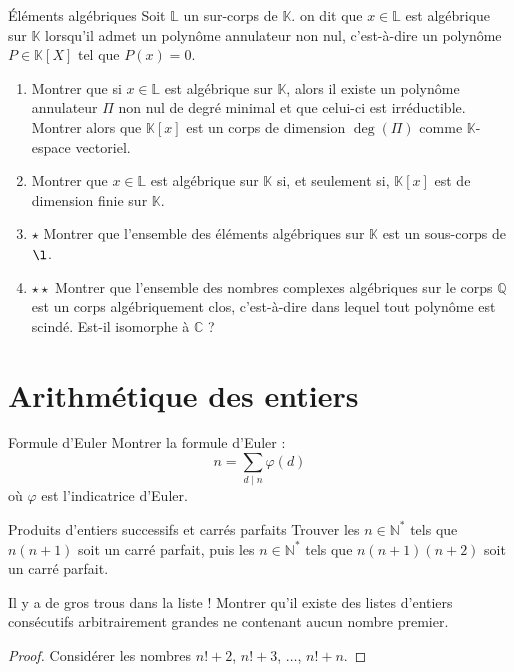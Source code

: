 \documentclass[french,a4paper]{article}
\newcommand{\N}{\mathbb{N}}
\newcommand{\Q}{\mathbb{Q}}
\newcommand{\C}{\mathbb{C}}
\newcommand{\K}{\mathbb{K}}
\renewcommand{\L}{\mathbb{L}}
\newcommand{\st}{^*}
\theoremstyle{plain}
\theoremstyle{definition}
\theoremstyle{remark}
\begin{document}
\begin{ex}[Moulin.AG.45]{Éléments algébriques}
	Soit $\L$ un sur-corps de $\K$. on dit que $x\in\L$ est algébrique sur $\K$ lorsqu'il admet un polynôme annulateur non nul, c'est-à-dire un polynôme $P\in\K[X]$ tel que $P(x)=0$.
	\begin{enumerate}
		\item Montrer que si $x\in\L$ est algébrique sur $\K$, alors il existe un polynôme annulateur $\Pi$ non nul de degré minimal et que celui-ci est irréductible. Montrer alors que $\K[x]$ est un corps de dimension $\deg(\Pi)$ comme $\K$-espace vectoriel.
		\item Montrer que $x\in\L$ est algébrique sur $\K$ si, et seulement si, $\K[x]$ est de dimension finie sur $\K$.
		\item $\star$ Montrer que l'ensemble des éléments algébriques sur $\K$ est un sous-corps de $\l$.
		\item $\star\star$ Montrer que l'ensemble des nombres complexes algébriques sur le corps $\Q$ est un corps algébriquement clos, c'est-à-dire dans lequel tout polynôme est scindé. Est-il isomorphe à $\C$ ?
	\end{enumerate}
\end{ex}

\section{Arithmétique des entiers}

\begin{ex}[Moulin.AG.46]{Formule d'Euler}
	Montrer la formule d'Euler : $$n=\sum_{d\mid n}\varphi(d)$$ où $\varphi$ est l'indicatrice d'Euler.
\end{ex}

\begin{ex}[Moulin.AG.47]{Produits d'entiers successifs et carrés parfaits}
	Trouver les $n\in\N\st$ tels que $n(n+1)$ soit un carré parfait, puis les $n\in\N\st$ tels que $n(n+1)(n+2)$ soit un carré parfait.
\end{ex}

\begin{ex}{Il y a de gros trous dans la liste !}
	Montrer qu'il existe des listes d'entiers consécutifs arbitrairement grandes ne contenant aucun nombre premier.
\end{ex}
\begin{proof}
	Considérer les nombres $n!+2$, $n!+3$, $\ldots$, $n!+n$.
\end{proof}
\end{document}
